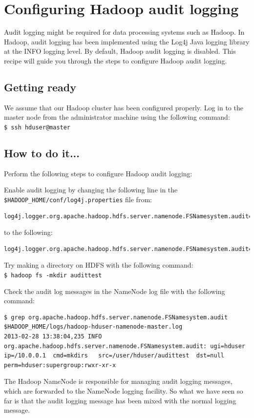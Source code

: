 \section{Configuring Hadoop audit logging}
Audit logging might be required for data processing systems such as Hadoop. In Hadoop, audit logging has been implemented using the Log4j Java logging library at the INFO logging level. By default, Hadoop audit logging is disabled. This recipe will guide you through the steps to configure Hadoop audit logging.

\subsection*{Getting ready}
We assume that our Hadoop cluster has been configured properly.
Log in to the master node from the administrator machine using the following command:\\ 
\verb|$ ssh hduser@master|

\subsection*{How to do it...}
Perform the following steps to configure Hadoop audit logging: 

Enable audit logging by changing the following line in the \verb|$HADOOP_HOME/conf/log4j.properties| file from: 
\lstset{style=bashstyle}
\begin{lstlisting}
log4j.logger.org.apache.hadoop.hdfs.server.namenode.FSNamesystem.audit=WARN
\end{lstlisting}

to the following:
\lstset{style=bashstyle}
\begin{lstlisting}
log4j.logger.org.apache.hadoop.hdfs.server.namenode.FSNamesystem.audit=INFO
\end{lstlisting}

Try making a directory on HDFS with the following command: \\
\verb|$ hadoop fs -mkdir audittest|

Check the audit log messages in the NameNode log file with the following command:
\lstset{style=bashstyle}
\begin{lstlisting}
$ grep org.apache.hadoop.hdfs.server.namenode.FSNamesystem.audit $HADOOP_HOME/logs/hadoop-hduser-namenode-master.log
2013-02-28 13:38:04,235 INFO org.apache.hadoop.hdfs.server.namenode.FSNamesystem.audit: ugi=hduser    ip=/10.0.0.1  cmd=mkdirs   src=/user/hduser/audittest  dst=null        perm=hduser:supergroup:rwxr-xr-x
\end{lstlisting}
The Hadoop NameNode is responsible for managing audit logging messages, which are forwarded to the NameNode logging facility. So what we have seen so far is that the audit logging message has been mixed with the normal logging message.

